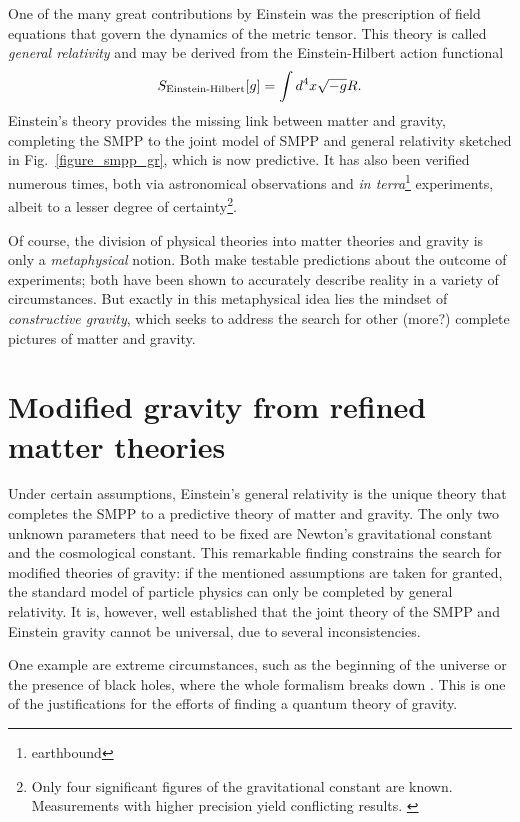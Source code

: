 One of the many great contributions by Einstein was the prescription of field equations that govern the dynamics of the metric tensor. \cite{Einstein_1916} This theory is called \emph{general relativity} and may be derived from the Einstein-Hilbert action functional
\begin{equation*}
  S_\text{Einstein-Hilbert}\lbrack g\rbrack = \int\mathrm \mathrm d^4x \sqrt{-g} R.
\end{equation*}
Einstein's theory provides the missing link between matter and gravity, completing the SMPP to the joint model of SMPP and general relativity sketched in Fig.~\ref{figure_smpp_gr}, which is now predictive. It has also been verified numerous times, both via astronomical observations and \emph{in terra}\footnote{earthbound} experiments, albeit to a lesser degree of certainty\footnote{Only four significant figures of the gravitational constant are known. \cite{Mohr_2016} Measurements with higher precision yield conflicting results. \cite{Mohr_2012}}.

Of course, the division of physical theories into matter theories and gravity is only a \emph{metaphysical} notion. Both make testable predictions about the outcome of experiments; both have been shown to accurately describe reality in a variety of circumstances. But exactly in this metaphysical idea lies the mindset of \emph{constructive gravity}, which seeks to address the search for other (more?) complete pictures of matter and gravity.

\section{Modified gravity from refined matter theories}
Under certain assumptions, Einstein's general relativity is the unique theory that completes the SMPP to a predictive theory of matter and gravity. \cite{Lovelock_1969,Hojman_1976,Deser_1970} The only two unknown parameters that need to be fixed are Newton's gravitational constant and the cosmological constant. This remarkable finding constrains the search for modified theories of gravity: if the mentioned assumptions are taken for granted, the standard model of particle physics can only be completed by general relativity. It is, however, well established that the joint theory of the SMPP and Einstein gravity cannot be universal, due to several inconsistencies.

One example are extreme circumstances, such as the beginning of the universe or the presence of black holes, where the whole formalism breaks down \cite{}. This is one of the justifications for the efforts of finding a quantum theory of gravity.

